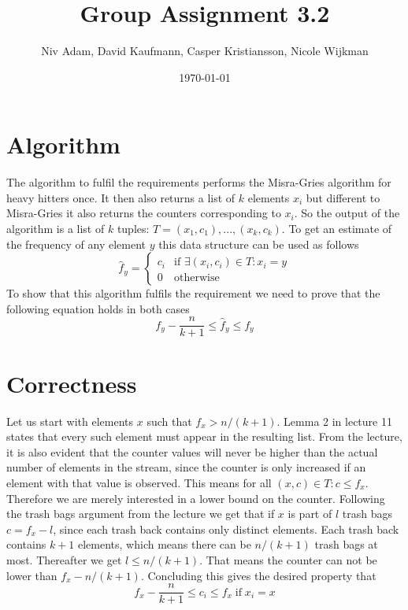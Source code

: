 \documentclass{article}
\title{Group Assignment 3.2}
\author{Niv Adam, David Kaufmann, Casper Kristiansson, Nicole Wijkman}
\date{\today}
\begin{document}
\maketitle

\section{Algorithm}
The algorithm to fulfil the requirements performs the Misra-Gries algorithm for heavy hitters once. It then also returns a list of $k$ elements $x_i$ but different to Misra-Gries it also returns the counters corresponding to $x_i$. So the output of the algorithm is a list of $k$ tuples: $T=(x_1, c_1),...,(x_k, c_k)$. To get an estimate of the frequency of any element $y$ this data structure can be used as follows
\begin{equation}
    \hat{f}_y= 
    \begin{cases}
        c_i &\text{if $\exists (x_i, c_i) \in T: x_i = y$} \\
        0 & \text{otherwise}        
    \end{cases}
\end{equation}
To show that this algorithm fulfils the requirement we need to prove that the following equation holds in both cases
\begin{equation}
    f_y - \frac{n}{k+1} \leq \hat{f}_y \leq f_y
\end{equation}

\section{Correctness}
Let us start with elements $x$ such that $f_x > n/(k+1)$. Lemma 2 in lecture 11 states that every such element must appear in the resulting list. From the lecture, it is also evident that the counter values will never be higher than the actual number of elements in the stream, since the counter is only increased if an element with that value is observed. This means for all $(x,c) \in T: c \leq f_x$. Therefore we are merely interested in a lower bound on the counter. Following the trash bags argument from the lecture we get that if $x$ is part of $l$ trash bags $c = f_x - l$, since each trash back contains only distinct elements. Each trash back contains $k+1$ elements, which means there can be $n/(k+1)$ trash bags at most. Thereafter we get $l \leq n/(k+1)$. That means the counter can not be lower than $f_x - n/(k+1)$. Concluding this gives the desired property that 
\begin{equation}
    f_x - \frac{n}{k+1} \leq c_i \leq f_x \; \text{if} \; x_i = x
\end{equation}
\end{document}
